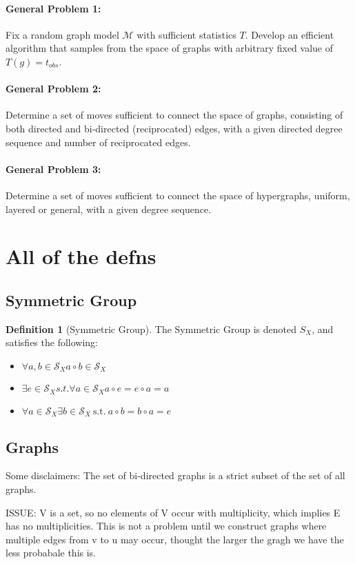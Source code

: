 \documentclass{article}
\theoremstyle{definition}
\newtheorem{definition}{Definition}
\begin{document}
\paragraph{General Problem 1:} Fix a random graph model $\mathcal{M}$ with sufficient statistics $T$. Develop an efficient algorithm that samples from the space of graphs with arbitrary fixed value of $T(g) = t_{obs}$.

\paragraph{General Problem 2:} Determine a set of moves sufficient to connect the space of graphs, consisting of both directed and bi-directed (reciprocated) edges, with a given directed degree sequence and number of reciprocated edges.

\paragraph{General Problem 3:} Determine a set of moves sufficient to connect the space of hypergraphs, uniform, layered or general, with a given degree sequence.


\section{All of the defns}
\subsection{Symmetric Group}
\begin{definition}[Symmetric Group] The Symmetric Group is denoted $S_X$, and satisfies the following:
\begin{itemize}
\item \( \forall a,b \in \mathcal{S}_X  a \circ b \in \mathcal{S}_X \)
\item \( \exists e \in \mathcal{S}_X s.t. \forall a \in \mathcal{S}_X a \circ e = e \circ a = a\)
\item \( \forall a \in \mathcal{S}_X \exists b \in \mathcal{S}_X \: \text{s.t.} \: a \circ b = b \circ a = e\)
\end{itemize}
\end{definition}

\subsection{Graphs}
Some disclaimers:
The set of bi-directed graphs is a strict subset of the set of all graphs. 

ISSUE: V is a set, so no elements of V occur with multiplicity, which implies E has no multiplicities. This is not a problem until we construct graphs where multiple edges from v to u may occur, thought the larger the gragh we have the less probabale this is.
\end{document}
